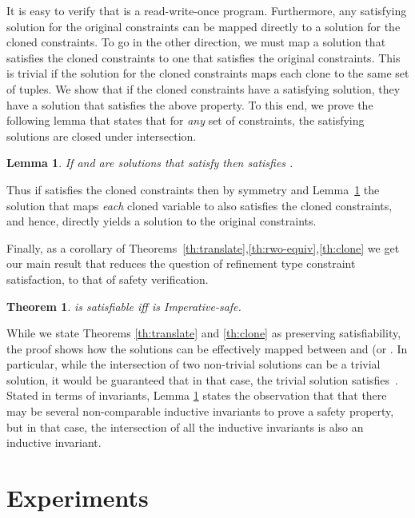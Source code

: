 \documentclass[nocopyrightspace]{sigplanconf}
\makeatletter
\newtheorem{@protheo}{Theorem}
\newenvironment{theorem}[1]{\begin{@protheo}{\rm \bf #1}\it}{\end{@protheo}}
\newtheorem{lemma}{Lemma}{\bfseries\upshape}{\itshape}
\def\IMPSEM{{Imperative}\xspace}
\makeatother
\begin{document}
It is easy to verify that  is a read-write-once
program. 
Furthermore, any satisfying solution for the original
constraints can be mapped directly to a solution for 
the cloned constraints. 
To go in the other direction, we must map a solution that satisfies the
cloned constraints to one that satisfies the original constraints.
This is trivial if the solution for the cloned constraints 
maps each clone  to the same set of tuples.
We show that if the cloned constraints have a satisfying solution,
they have a solution that satisfies the above property.
To this end, we prove the following lemma that states 
that for \emph{any} set of constraints, the satisfying 
solutions are closed under intersection.

\begin{lemma}{}\label{lemma:solnintersect}
If  and  are solutions that satisfy  
then 
satisfies .
\end{lemma}

Thus if  satisfies the cloned constraints
then by symmetry and Lemma~\ref{lemma:solnintersect} 
the solution that maps \emph{each} cloned variable 
to  also satisfies 
the cloned constraints, and hence, directly yields 
a solution to the original constraints.

Finally, as a corollary of 
Theorems~\ref{th:translate},\ref{th:rwo-equiv},\ref{th:clone} 
we get our main result that reduces the question 
of refinement type constraint satisfaction,
to that of safety verification.

\begin{theorem}{}\label{th:equiv}
 is satisfiable iff  is \IMPSEM-safe.
\end{theorem}

While we state Theorems \ref{th:translate} and \ref{th:clone} as
preserving satisfiability, the proof shows how the solutions can be
effectively mapped between  and  (or
. 
In particular, while the intersection of two non-trivial solutions can
be a trivial solution, it would be guaranteed that in that case, the
trivial solution satisfies~. 
Stated in terms of invariants, Lemma \ref{lemma:solnintersect} states
the observation that that there may be several non-comparable
inductive invariants to prove a safety property, but in that case, the
intersection of all the inductive invariants is also an inductive
invariant. 





\section{Experiments}\label{sec:experiments}
\end{document}
